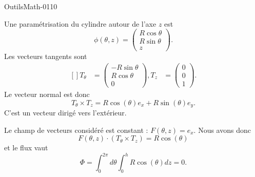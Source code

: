 
\begin{corrige}{OutilsMath-0110}

    Une paramétrisation du cylindre autour de l'axe $z$ est
    \begin{equation}
        \phi(\theta,z)=\begin{pmatrix}
            R\cos\theta    \\ 
            R\sin\theta    \\ 
            z    
        \end{pmatrix}.
    \end{equation}
    Les vecteurs tangents sont
    \begin{equation}
        \begin{aligned}[]
            T_{\theta}&=\begin{pmatrix}
                -R\sin\theta    \\ 
                R\cos\theta    \\ 
                0    
            \end{pmatrix},
            T_z&=\begin{pmatrix}
                0    \\ 
                0    \\ 
                1    
            \end{pmatrix}.
        \end{aligned}
    \end{equation}
    Le vecteur normal est donc
    \begin{equation}
        T_{\theta}\times T_z=R\cos(\theta)e_x+R\sin(\theta)e_y.
    \end{equation}
    C'est un vecteur dirigé vers l'extérieur.

    Le champ de vecteurs considéré est constant : $F(\theta,z)=e_x$. Nous avons donc
    \begin{equation}
        F(\theta,z)\cdot(T_{\theta}\times T_z)=R\cos(\theta)
    \end{equation}
    et le flux vaut
    \begin{equation}
        \Phi=\int_0^{2\pi}d\theta\int_0^hR\cos(\theta)dz=0.
    \end{equation}
    

\end{corrige}

